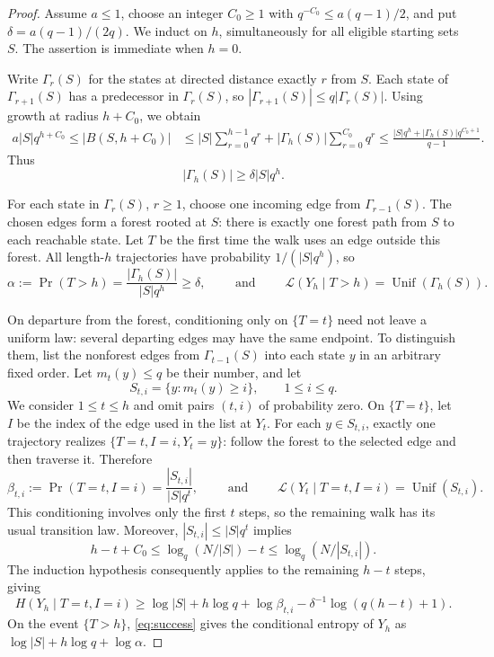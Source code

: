 \documentclass[11pt,reqno]{amsart}
\theoremstyle{definition}
\begin{document}
\begin{proof}
Assume $a\le1$, choose an integer $C_0\ge1$ with
$q^{-C_0}\le a(q-1)/2$, and put $\delta=a(q-1)/(2q)$.
We induct on $h$, simultaneously for all eligible starting sets $S$.
The assertion is immediate when $h=0$.

Write $\Gamma_r(S)$ for the states at directed distance exactly $r$
from $S$. Each state of $\Gamma_{r+1}(S)$ has a predecessor in
$\Gamma_r(S)$, so $|\Gamma_{r+1}(S)|\le q|\Gamma_r(S)|$.
Using growth at radius $h+C_0$, we obtain
\[
 \begin{aligned}
 a|S|q^{h+C_0} \le |B(S,h+C_0)| 
 &\le |S|\sum_{r=0}^{h-1}q^r
       +|\Gamma_h(S)|\sum_{r=0}^{C_0}q^r \le\frac{|S|q^h+|\Gamma_h(S)|q^{C_0+1}}{q-1}.
 \end{aligned}
\]
Thus
\begin{equation}\label{eq:layer}
 |\Gamma_h(S)|\ge\delta|S|q^h.
\end{equation}

For each state in $\Gamma_r(S)$, $r\ge1$, choose one incoming edge
from $\Gamma_{r-1}(S)$. The chosen edges form a forest rooted at $S$:
there is exactly one forest path from $S$ to each reachable state.
Let $T$ be the first time the walk uses an edge outside this forest.
All length-$h$ trajectories have probability $1/(|S|q^h)$, so
\begin{equation}\label{eq:success}
 \alpha :=\Pr(T>h)=\frac{|\Gamma_h(S)|}{|S|q^h}\ge\delta,
 \qquad \text{ and } \qquad
 \mathcal L(Y_h\mid T>h)=\operatorname{Unif}(\Gamma_h(S)).
\end{equation}

On departure from the forest, conditioning only on $\{T=t\}$ need not
leave a uniform law: several departing edges may have the same
endpoint. To distinguish them, list the nonforest edges from
$\Gamma_{t-1}(S)$ into each state $y$ in an arbitrary fixed order.
Let $m_t(y)\le q$ be their number, and let
\[
 S_{t,i}=\{y:m_t(y)\ge i\},\qquad 1\le i\le q.
\]
We consider $1\le t\le h$ and omit pairs $(t,i)$ of probability zero.
On $\{T=t\}$, let $I$ be the index of the edge used in the list at
$Y_t$. For each $y\in S_{t,i}$, exactly one trajectory realizes
$\{T=t,I=i,Y_t=y\}$: follow the forest to the selected edge and
then traverse it. Therefore
\begin{equation}\label{eq:branch}
 \beta_{t,i}:=\Pr(T=t,I=i)=\frac{|S_{t,i}|}{|S|q^t},
 \qquad \text{ and } \qquad
 \mathcal L(Y_t\mid T=t,I=i)=\operatorname{Unif}(S_{t,i}).
\end{equation}
This conditioning involves only the first
$t$ steps, so the remaining walk has its usual transition law.
Moreover, $|S_{t,i}|\le|S|q^t$ implies
\[
 h-t+C_0\le\log_q(N/|S|)-t\le\log_q(N/|S_{t,i}|).
\]
The induction hypothesis consequently applies to the remaining
$h-t$ steps, giving
\[
 H(Y_h\mid T=t,I=i)
 \ge \log|S|+h\log q+\log\beta_{t,i}
      -\delta^{-1}\log(q(h-t)+1).
\]
On the event $\{T>h\}$, \eqref{eq:success} gives the conditional entropy of $Y_h$ as
$\log|S|+h\log q+\log\alpha$.


\end{proof}
\end{document}
